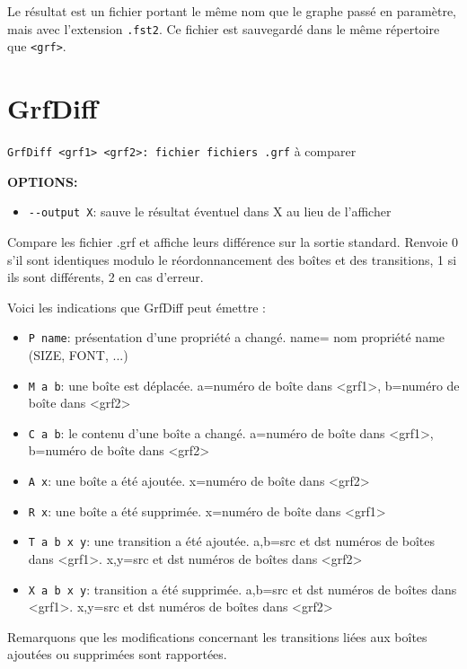 \bigskip
\noindent Le résultat est un fichier portant le même nom que le graphe passé en paramètre, mais
avec l’extension \verb+.fst2+. Ce fichier est sauvegardé dans le même répertoire que \verb+<grf>+.





\section{GrfDiff}
\verb+GrfDiff <grf1> <grf2>: fichier fichiers .grf+  à comparer

\noindent \textbf{OPTIONS:}
\begin{itemize}
\item \verb+--output X+: sauve le résultat éventuel dans X au lieu de l'afficher
\end{itemize}
         
Compare les fichier .grf et affiche leurs différence sur la sortie standard.
Renvoie 0 s'il sont identiques modulo le réordonnancement des boîtes et des transitions, 1 si ils sont différents, 2 en cas d'erreur.
		 
Voici les indications que GrfDiff peut  émettre :
\begin{itemize}
		 
\item \verb+P name+: présentation d'une propriété a changé. name= nom propriété name (SIZE, FONT,
		...)
\item \verb+M a b+:  une boîte est déplacée. a=numéro de boîte dans <grf1>, b=numéro de boîte dans
	<grf2>
\item \verb+C a b+:  le contenu d'une boîte a changé. a=numéro de boîte dans <grf1>, b=numéro de
	boîte dans <grf2>
\item \verb+A x+:    une boîte a été ajoutée. x=numéro de boîte dans <grf2>
\item \verb+R x+:    une boîte a été supprimée. x=numéro de boîte dans <grf1>
\item \verb+T a b x y+: une transition a été ajoutée. a,b=src et dst numéros de boîtes dans <grf1>.
	x,y=src et dst numéros de boîtes dans <grf2>
\item \verb+X a b x y+: transition a été supprimée. a,b=src et dst numéros de boîtes dans <grf1>.
	x,y=src et dst numéros de boîtes dans <grf2>
\end{itemize}
		 
Remarquons que les modifications concernant les transitions liées aux boîtes ajoutées ou supprimées
sont rapportées.





